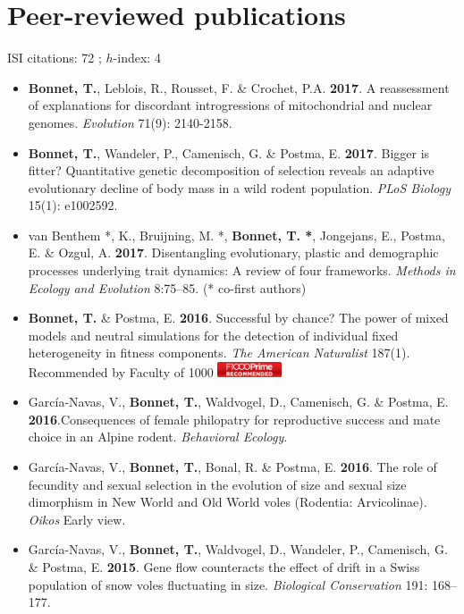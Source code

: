 \documentclass[a4paper,10pt]{article} %
\begin{document}
\section*{Peer-reviewed publications}
ISI citations: 72 ; $h$-index: 4
\vspace{10pt}
\begin{itemize}
\item \textbf{Bonnet, T.}, Leblois, R., Rousset, F. \& Crochet, P.A. \textbf{2017}. A reassessment of explanations for discordant introgressions of mitochondrial and nuclear genomes. \textit{Evolution} 71(9): 2140-2158.
\item \textbf{Bonnet, T.}, Wandeler, P., Camenisch, G. \& Postma, E. \textbf{2017}. Bigger is fitter? Quantitative genetic decomposition of selection reveals an adaptive evolutionary decline of body mass in a wild rodent population. \textit{PLoS Biology} 15(1): e1002592.
\item van Benthem *, K., Bruijning, M. *, \textbf{Bonnet, T. *}, Jongejans, E., Postma, E. \& Ozgul, A. \textbf{2017}. Disentangling evolutionary, plastic and demographic processes underlying trait dynamics: A review of four frameworks. \textit{Methods in Ecology and Evolution} 8:75--85. (* co-first authors) 
\item \textbf{Bonnet, T.} \& Postma, E. \textbf{2016}. Successful by chance? The power of mixed models and neutral simulations for the detection of individual fixed heterogeneity in fitness components. \textit{The American Naturalist} 187(1). {\footnotesize Recommended by Faculty of 1000}
\includegraphics[width=0.15\textwidth]{F1000badge}
\item Garc\'{i}a-Navas, V., \textbf{Bonnet, T.}, Waldvogel, D., Camenisch, G. \& Postma, E. \textbf{2016}.Consequences of female philopatry for reproductive success and mate choice in an Alpine rodent. \textit{Behavioral Ecology}.
\item Garc\'{i}a-Navas, V., \textbf{Bonnet, T.}, Bonal, R. \& Postma, E. \textbf{2016}. The role of fecundity and sexual selection in the evolution of size and sexual size dimorphism in New World and Old World voles (Rodentia: Arvicolinae). \textit{Oikos} Early view.
\item Garc\'{i}a-Navas, V., \textbf{Bonnet, T.}, Waldvogel, D., Wandeler, P., Camenisch, G. \& Postma, E. \textbf{2015}. Gene flow counteracts the effect of drift in a Swiss population of snow voles fluctuating in size. \textit{Biological Conservation} 191: 168--177.

\end{itemize}
\end{document}
